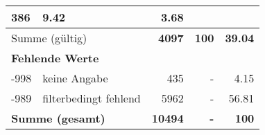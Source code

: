 \begin{longtable}{lXrrr}
       \num{386} &
       \num[round-mode=places,round-precision=2]{9,42} &
         \num[round-mode=places,round-precision=2]{3,68} \\
     \midrule
     \multicolumn{2}{l}{Summe (gültig)} &
       \textbf{\num{4097}} &
     \textbf{100} &
       \textbf{\num[round-mode=places,round-precision=2]{39,04}} \\
     \multicolumn{5}{l}{\textbf{Fehlende Werte}}\\
       -998 &
       keine Angabe &
         \num{435} &
        - &
         \num[round-mode=places,round-precision=2]{4,15} \\
       -989 &
       filterbedingt fehlend &
         \num{5962} &
        - &
         \num[round-mode=places,round-precision=2]{56,81} \\
     \midrule
     \multicolumn{2}{l}{\textbf{Summe (gesamt)}} &
          \textbf{\num{10494}} &
        \textbf{-} &
        \textbf{100} \\
     \bottomrule
     \end{longtable}
     
